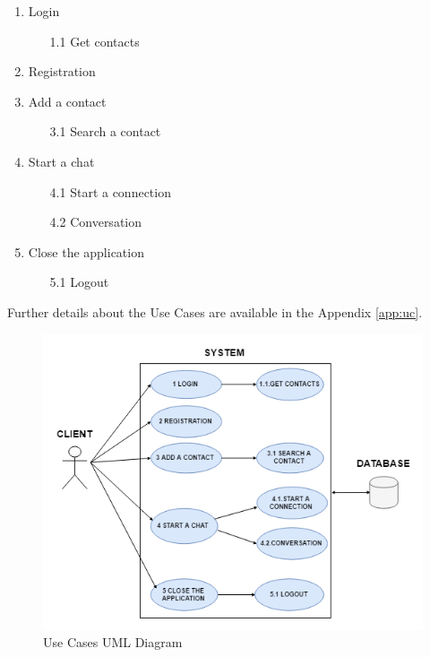 \documentclass[finalReport.tex]{subfiles}
\begin{document}
\begin{enumerate}
\item Login \label{UC:login}
\begin{itemize}
\item[1.1] Get contacts \label{UC:get_contacts}
\end{itemize}
\item Registration \label{UC:registration}
\item Add a contact \label{UC:add_contact}
\begin{itemize}
\item[3.1] Search a contact \label{UC:search_contact}
\end{itemize}
\item Start a chat \label{UC:start_chat}
\begin{itemize}
\item[4.1] Start a connection \label{UC:connection}
\item[4.2] Conversation	\label{UC:conversation}
\end{itemize}
\item Close the application \label{UC:close}
\begin{itemize}
\item[5.1] Logout \label{UC:logout}
\end{itemize}
\end{enumerate}

Further details about the Use Cases are available in the Appendix \ref{app:uc}.

\begin{figure}[h] 
\centering
\includegraphics[scale=0.75]{RandD/Plot/UMLusecases.png}
\caption{Use Cases UML Diagram}\label{Fig: UC}
\end{figure}
\end{document}
